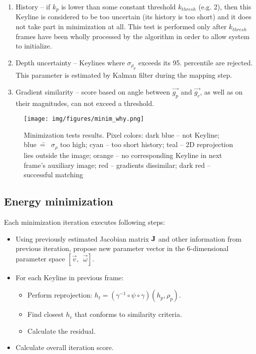 \begin{enumerate}
	\item History -- if $k_{p}$ is lower than some constant threshold $k_{thresh}$ (e.g. 2), then this Keyline is considered to be too uncertain (its history is too short) and it does not take part in minimization at all. This test is performed only after $k_{thresh}$ frames have been wholly processed by the algorithm in order to allow system to initialize.
	\item Depth uncertainty -- Keylines where $\sigma_{\rho_{p}}$ exceeds its 95. percentile are rejected. This parameter is estimated by Kalman filter during the mapping step.
	\item Gradient similarity -- score based on angle between $\vec{g_p}$ and $\vec{g_c}$, as well as on their magnitudes, can not exceed a threshold.
\end{enumerate}

\begin{figure}[ht]
	\centering\texttt{[image: img/figures/minim\_why.png]}
	\caption{ Minimization tests results. Pixel colors: dark blue -- not Keyline; blue~\==~ $\sigma_{\rho}$ too high; cyan -- too short history; teal -- 2D reprojection lies outside the image; orange -- no corresponding Keyline in next frame's auxiliary image; red -- gradients dissimilar; dark red -- successful matching }
	\label{fig:minim_why}
\end{figure}

\subsection{Energy minimization}
\label{sec:energyminim}

Each minimization iteration executes following steps:
\begin{itemize}
	\item Using previously estimated Jacobian matrix $\textbf{J}$ and other information from previous iteration, propose new parameter vector in the 6-dimensional parameter space $\left[ \vec{v},\ \ \vec{\omega} \right]$.
	\item For each Keyline in previous frame:
	\begin{itemize}
		\item Perform reprojection: $h_{t} = \left( \gamma^{-1} \circ \psi \circ \gamma \right) \left( h_p, \rho_{p} \right)$.
		\item Find closest $h_{c}$ that conforms to similarity criteria.
		\item Calculate the residual.
	\end{itemize}
	\item Calculate overall iteration score.
\end{itemize}

